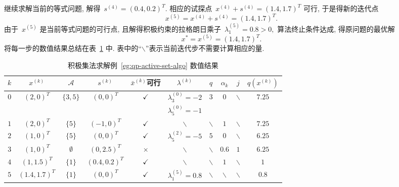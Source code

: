 \begin{exam}
继续求解当前的等式问题, 解得~${s}^{(4)} = (0.4, 0.2)^T.$ 相应的试探点~${x}^{(4)} + {s}^{(4)} = (1.4, 1.7)^T$ 可行, 于是得新的迭代点
\begin{equation*}
{x}^{(5)} = {x}^{(4)} + {s}^{(4)} = (1.4, 1.7)^T.
\end{equation*}
由于~${x}^{(5)}$ 是当前等式问题的可行点, 且解得积极约束的拉格朗日乘子~$\lambda_1^{(5)} = 0.8 > 0,$ 算法终止条件达成, 得原问题的最优解
\begin{equation*}
{x}^* = {x}^{(5)} = (1.4, 1.7)^T.
\end{equation*}
将每一步的数值结果总结在表~\ref{tab:active-set-eg} 中. 表中的``$\backslash$''表示当前迭代步不需要计算相应的量.
\begin{table}[H]
    \caption{积极集法求解例~\ref{eg:qp-active-set-algo} 数值结果}
    \label{tab:active-set-eg}
    \centering
    \begin{tabular}{cccccccccc}
    \hline
    $k$ & ${x}^{(k)}$ & $\mathcal{A}$ & ${s}^{(k)}$ & $\bar{{x}}^{(k)}$可行 & ${\lambda}^{(k)}$ & $q$ & $\alpha_k$ & $j$ & $q({x}^{(k)})$ \\
    \hline
    \multirow{2}{*}{$0$} & \multirow{2}{*}{$(2, 0)^T$} & \multirow{2}{*}{$\{ 3, 5 \}$} & \multirow{2}{*}{$(0, 0)^T$} & \multirow{2}{*}{$\checkmark$} & $\lambda_3^{(0)} = -2$ & \multirow{2}{*}{$3$} & \multirow{2}{*}{$0$} & \multirow{2}{*}{$\backslash$} & \multirow{2}{*}{$7.25$} \\
    & & & & & $\lambda_5^{(0)} = -1$ & & & \\
    $1$ & $(2, 0)^T$ & $\{ 5 \}$ & $(-1, 0)^T$ & $\checkmark$ & $\backslash$ & $\backslash$ & $1$ & $\backslash$ & $7.25$ \\
    $2$ & $(1, 0)^T$ & $\{ 5 \}$ & $(0, 0)^T$ & $\checkmark$ & $\lambda_5^{(2)} = -5$ & $5$ & $0$ & $\backslash$ & $6.25$ \\
    $3$ & $(1, 0)^T$ & $\emptyset$ & $(0, 2.5)^T$ & $\times$ & $\backslash$ & $\backslash$ & $0.6$ & $1$ & $6.25$ \\
    $4$ & $(1, 1.5)^T$ & $\{ 1 \}$ & $(0.4, 0.2)^T$ & $\checkmark$ & $\backslash$ & $\backslash$ & $1$ & $\backslash$ & $1$ \\
    $5$ & $(1.4, 1.7)^T$ & $\{ 1 \}$ & $(0, 0)^T$ & $\checkmark$ & $\lambda_1^{(5)} = 0.8$ & $\backslash$ & $\backslash$ & $\backslash$ & $0.8$ \\
    \hline
    \end{tabular}
\end{table}
\end{exam}
